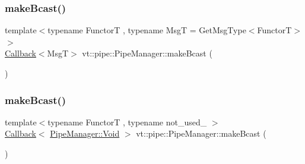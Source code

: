 \mbox{\label{structvt_1_1pipe_1_1_pipe_manager_a50e15818da3bc48ac9f129fbd30c3e31}} 
\subsubsection{\texorpdfstring{make\+Bcast()}{makeBcast()}\hspace{0.1cm}{\footnotesize\ttfamily [2/6]}}
{\footnotesize\ttfamily template$<$typename FunctorT , typename MsgT  = Get\+Msg\+Type$<$\+Functor\+T$>$$>$ \\
\hyperlink{namespacevt_a36db99df4c973d48b1118a293fff533f}{Callback}$<$MsgT$>$ vt\+::pipe\+::\+Pipe\+Manager\+::make\+Bcast (\begin{DoxyParamCaption}{ }\end{DoxyParamCaption})}

\mbox{\label{structvt_1_1pipe_1_1_pipe_manager_a42e6860c842d31411b7d90154a0c6a17}} 
\subsubsection{\texorpdfstring{make\+Bcast()}{makeBcast()}\hspace{0.1cm}{\footnotesize\ttfamily [3/6]}}
{\footnotesize\ttfamily template$<$typename FunctorT , typename not\+\_\+used\+\_\+ $>$ \\
\hyperlink{namespacevt_a36db99df4c973d48b1118a293fff533f}{Callback}$<$ \hyperlink{structvt_1_1pipe_1_1_pipe_manager_ab720c2580ecfd3ab36e49aeaaff64cc6}{Pipe\+Manager\+::\+Void} $>$ vt\+::pipe\+::\+Pipe\+Manager\+::make\+Bcast (\begin{DoxyParamCaption}{ }\end{DoxyParamCaption})}

\mbox{\label{structvt_1_1pipe_1_1_pipe_manager_a1fefc503b58bbdf791e76a6c8f339df6}} 
